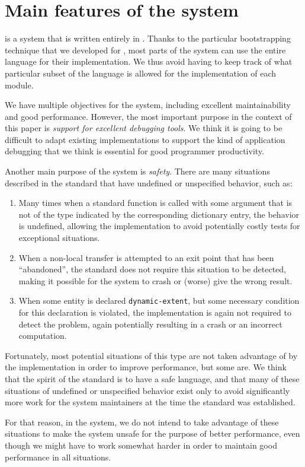 \section{Main features of the \sicl{} system}
\label{sec-sicl-features}

\sicl{} is a system that is written entirely in \commonlisp{}.  Thanks
to the particular bootstrapping technique
\cite{durand_irene_2019_2634314} that we developed for \sicl{}, most
parts of the system can use the entire language for their
implementation.  We thus avoid having to keep track of what particular
subset of the language is allowed for the implementation of each
module.

We have multiple objectives for the \sicl{} system, including
excellent maintainability and good performance.  However, the most
important purpose in the context of this paper is \emph{support for
  excellent debugging tools}.  We think it is going to be difficult to
adapt existing \commonlisp{} implementations to support the kind of
application debugging that we think is essential for good programmer
productivity.

Another main purpose of the \sicl{} system is \emph{safety}.  There
are many situations described in the \commonlisp{} standard that have
undefined or unspecified behavior, such as:

\begin{enumerate}
\item Many times when a standard function is called with some argument
  that is not of the type indicated by the corresponding dictionary
  entry, the behavior is undefined, allowing the implementation to
  avoid potentially costly tests for exceptional situations.
\item When a non-local transfer is attempted to an exit point that has
  been ``abandoned'', the standard does not require this situation to
  be detected, making it possible for the system to crash or (worse)
  give the wrong result.
\item When some entity is declared \texttt{dynamic-extent}, but some
  necessary condition for this declaration is violated, the
  implementation is again not required to detect the problem, again
  potentially resulting in a crash or an incorrect computation.
\end{enumerate}

Fortunately, most potential situations of this type are not taken
advantage of by the implementation in order to improve performance,
but some are.  We think that the spirit of the \commonlisp{} standard
is to have a safe language, and that many of these situations of
undefined or unspecified behavior exist only to avoid significantly
more work for the system maintainers at the time the standard was
established.

For that reason, in the \sicl{} system, we do not intend to take
advantage of these situations to make the system unsafe for the
purpose of better performance, even though we might have to work
somewhat harder in order to maintain good performance in all
situations.
